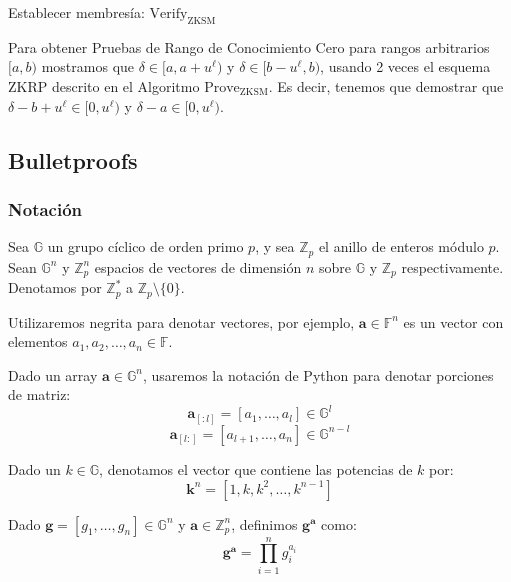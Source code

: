 \begin{minipage}{1\textwidth}
    \begin{algorithm}[H]
        \caption{Establecer membresía: $\operatorname{Verify_{ZKSM}}$}
    \end{algorithm}
\end{minipage}

Para obtener Pruebas de Rango de Conocimiento Cero para rangos arbitrarios $[a, b)$ mostramos que $\delta \in [a, a + u^{\ell})$ y $\delta \in [b - u^{\ell}, b)$, usando 2 veces el esquema ZKRP descrito en el Algoritmo $\operatorname{Prove_{ZKSM}}$. Es decir, tenemos que demostrar que $\delta - b + u^{\ell} \in [0, u^{\ell})$ y $\delta - a \in [0, u^{\ell})$.

\subsection{Bulletproofs}

\subsubsection{Notación}

Sea $\mathbb{G}$ un grupo cíclico de orden primo $p$, y sea $\mathbb{Z}_{p}$ el anillo de enteros módulo $p$. Sean $\mathbb{G}^{n}$ y $\mathbb{Z}_{p}^{n}$ espacios de vectores de dimensión $n$ sobre $\mathbb{G}$ y $\mathbb{Z}_{p}$ respectivamente. Denotamos por $\mathbb{Z}_{p}^{*}$ a $\mathbb{Z}_{p} \setminus \{0\}$.

Utilizaremos negrita para denotar vectores, por ejemplo, $\mathbf{a} \in \mathbb{F}^{n}$ es un vector con elementos $a_{1}, a_{2}, \dots, a_{n} \in \mathbb{F}$.

Dado un array $\mathbf{a} \in \mathbb{G}^{n}$, usaremos la notación de Python para denotar porciones de matriz:
$$\mathbf{a}_{[:l]} = [a_{1}, \dots, a_{l}] \in \mathbb{G}^{l}$$
$$\mathbf{a}_{[l:]} = [a_{l+1}, \dots, a_{n}] \in \mathbb{G}^{n-l}$$

Dado un $k \in \mathbb{G}$, denotamos el vector que contiene las potencias de $k$ por:
$$\mathbf{k}^{n} = [1, k, k^{2}, \dots, k^{n-1}]$$

Dado $\mathbf{g} = [g_{1}, \dots, g_{n}] \in \mathbb{G}^{n}$ y $\mathbf{a} \in \mathbb{Z}_{p}^{n}$, definimos $\mathbf{g}^{\mathbf{a}}$ como:
$$\mathbf{g}^{\mathbf{a}} = \prod_{i=1}^{n} g_{i}^{a_{i}}$$

